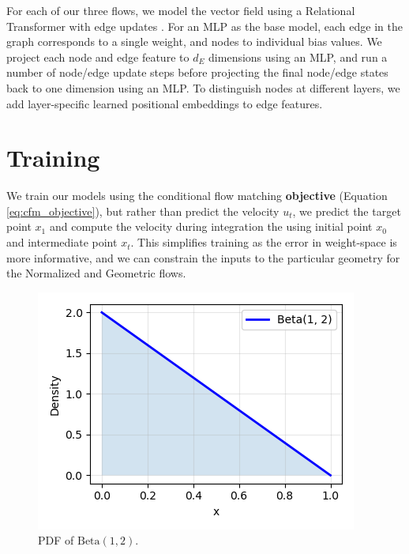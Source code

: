 For each of our three flows, we model the vector field using a Relational Transformer with edge updates \citep{diaoRelationalAttentionGeneralizing2023,kofinasGraphNeuralNetworks2024}. For an MLP as the base model, each edge in the graph corresponds to a single weight, and nodes to individual bias values. We project each node and edge feature to $d_E$ dimensions using an MLP, and run a number of node/edge update steps before projecting the final node/edge states back to one dimension using an MLP. To distinguish nodes at different layers, we add layer-specific learned positional embeddings to edge features. 

\section{Training}

We train our models using the conditional flow matching \textbf{objective} (Equation \ref{eq:cfm_objective}), but rather than predict the velocity $u_t$, we predict the target point $x_1$ and compute the velocity during integration the using initial point $x_0$ and intermediate point $x_t$. This simplifies training as the error in weight-space is more informative, and we can constrain the inputs to the particular geometry for the Normalized and Geometric flows. 

\begin{figure}
    \centering
        \includegraphics[width=\linewidth]{figures/beta.png}
    \caption{\label{fig:beta}PDF of $\text{Beta}(1,2)$.}
\end{figure}


